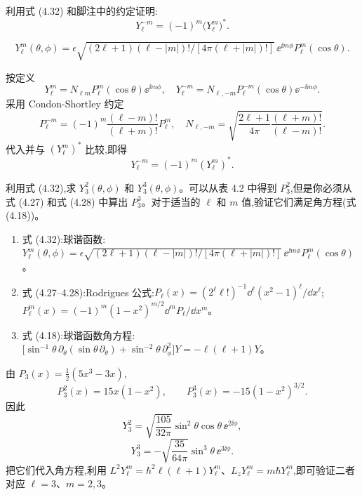 \begin{question}
利用式 (4.32) 和脚注中的约定证明:
\[
Y_\ell^{-m}=(-1)^m\bigl(Y_\ell^m\bigr)^* .
\]

\par\smallskip
{}\[Y_\ell^m(\theta,\phi)=\epsilon\sqrt{(2\ell+1)(\ell-|m|)!/[4\pi(\ell+|m|)!]}\,\ee^{\ii m\phi}P_\ell^m(\cos\theta).\]

\begin{solution}

按定义
\[
Y_\ell^m=N_{\ell m}P_\ell^m(\cos\theta)\ee^{\ii m\phi},
\quad
Y_\ell^{-m}=N_{\ell,-m}P_\ell^{-m}(\cos\theta)\ee^{-\ii m\phi}.
\]
采用 Condon-Shortley 约定
\[
P_\ell^{-m}=(-1)^m\frac{(\ell-m)!}{(\ell+m)!}P_\ell^m,
\quad
N_{\ell,-m}=\sqrt{\frac{2\ell+1}{4\pi}\frac{(\ell+m)!}{(\ell-m)!}}.
\]
代入并与 $(Y_\ell^m)^*$ 比较,即得
\[
Y_\ell^{-m}=(-1)^m(Y_\ell^m)^*.
\]

\end{solution}
\end{question}

\begin{question}
利用式 (4.32),求 $Y_3^2(\theta,\phi)$ 和 $Y_3^3(\theta,\phi)$。可以从表 4.2 中得到 $P_3^2$,但是你必须从式 (4.27) 和式 (4.28) 中算出 $P_3^3$。对于适当的 $\ell$ 和 $m$ 值,验证它们满足角方程(式 (4.18))。

\par\smallskip
{}
\begin{enumerate}[leftmargin=2.2em,itemsep=0.12em,topsep=0.12em,parsep=0pt]
\item 式 (4.32):球谐函数:$Y_\ell^m(\theta,\phi)=\epsilon\sqrt{(2\ell+1)(\ell-|m|)!/[4\pi(\ell+|m|)!]}\,\ee^{\ii m\phi}P_\ell^m(\cos\theta)$。
\item 式 (4.27--4.28):Rodrigues 公式:$P_\ell(x)=(2^\ell\ell!)^{-1}\dd^\ell(x^2-1)^\ell/\dd x^\ell$;$P_\ell^m(x)=(-1)^m(1-x^2)^{m/2}\dd^mP_\ell/\dd x^m$。
\item 式 (4.18):球谐函数角方程:$\bigl[\sin^{-1}\theta\,\partial_\theta(\sin\theta\,\partial_\theta)+\sin^{-2}\theta\,\partial_\phi^2\bigr]Y=-\ell(\ell+1)Y$。
\end{enumerate}

\begin{solution}

由 $P_3(x)=\tfrac12(5x^3-3x)$,
\[
P_3^2(x)=15x(1-x^2),\qquad P_3^3(x)=-15(1-x^2)^{3/2}.
\]
因此
\[
Y_3^2=\sqrt{\frac{105}{32\pi}}\sin^2\theta\cos\theta\,\ee^{2\ii\phi},
\]
\[
Y_3^3=-\sqrt{\frac{35}{64\pi}}\sin^3\theta\,\ee^{3\ii\phi}.
\]
把它们代入角方程,利用 $L^2Y_\ell^m=\hbar^2\ell(\ell+1)Y_\ell^m$、$L_zY_\ell^m=m\hbar Y_\ell^m$,即可验证二者对应 $\ell=3$、$m=2,3$。

\end{solution}
\end{question}

